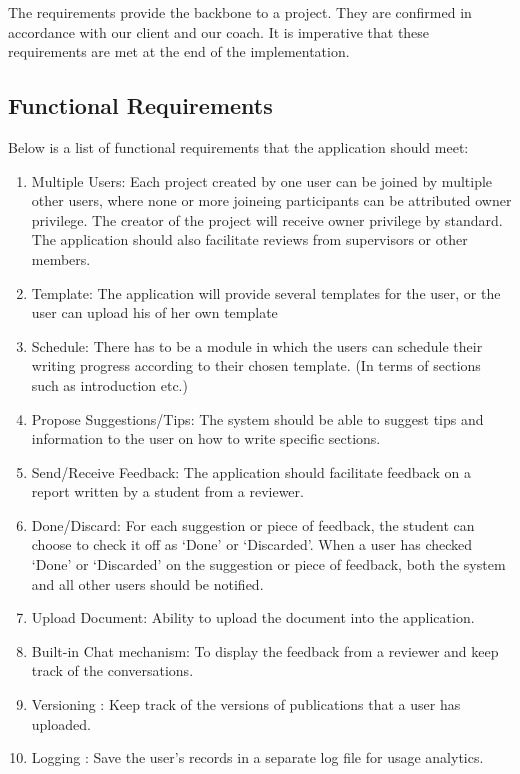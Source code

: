 The requirements provide the backbone to a project. They are confirmed in accordance with our client and our coach. It is imperative that these requirements are met at the end of the implementation.

\subsection{Functional Requirements} %
\label{sub:functional_requirement}

Below is a list of functional requirements that the application should meet:

\begin{enumerate}
	\item Multiple Users: Each project created by one user can be joined by multiple other users, where none or more joineing participants can be attributed owner privilege. The creator of the project will receive owner privilege by standard. The application should also facilitate reviews from supervisors or other members.
	\item Template: The application will provide several templates for the user, or the user can upload his of her own template
	\item Schedule: There has to be a module in which the users can schedule their writing progress according to their chosen template. (In terms of sections such as introduction etc.)
	\item Propose Suggestions/Tips: The system should be able to suggest tips and information to the user on how to write specific sections.
	\item Send/Receive Feedback: The application should facilitate feedback on a report written by a student from a reviewer.
	\item Done/Discard: For each suggestion or piece of feedback, the student can choose to check it off as `Done' or `Discarded'. When a user has checked `Done' or `Discarded' on the suggestion or piece of feedback, both the system and all other users should be notified. 
	\item Upload Document: Ability to upload the document into the application.
	\item Built-in Chat mechanism: To display the feedback from a reviewer and keep track of the conversations. 
	\item Versioning : Keep track of the versions of publications that a user has uploaded.
	\item Logging : Save the user's records in a separate log file for usage analytics.
\end{enumerate}

